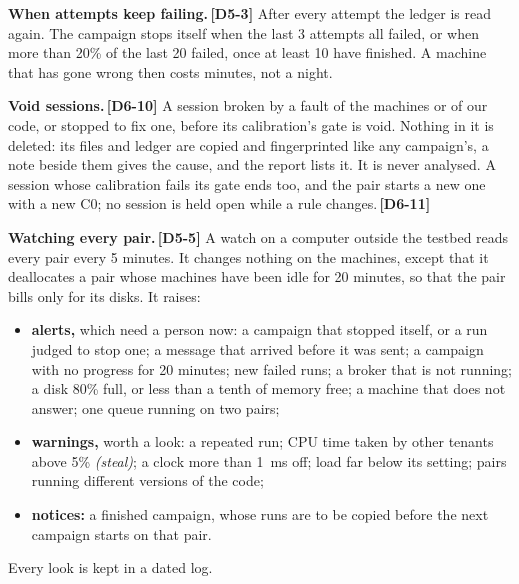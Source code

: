 \documentclass[11pt]{article}
\newcommand{\gl}[1]{{\color{soft}\itshape\small (#1)}}
\newcommand{\chgold}[1]{\,{\color{oldcol}\bfseries\footnotesize[#1]}}
\begin{document}
\textbf{When attempts keep failing.}\chgold{D5-3} After every attempt the ledger is read again. The campaign stops itself when the last 3 attempts all failed, or when more than 20\% of the last 20 failed, once at least 10 have finished. A machine that has gone wrong then costs minutes, not a night.

\textbf{Void sessions.}\chgold{D6-10} A session broken by a fault of the machines or of our code, or stopped to fix one, before its calibration's gate is void. Nothing in it is deleted: its files and ledger are copied and fingerprinted like any campaign's, a note beside them gives the cause, and the report lists it. It is never analysed. A session whose calibration fails its gate ends too, and the pair starts a new one with a new C0; no session is held open while a rule changes.\chgold{D6-11}

\textbf{Watching every pair.}\chgold{D5-5} A watch on a computer outside the testbed reads every pair every 5 minutes. It changes nothing on the machines, except that it deallocates a pair whose machines have been idle for 20 minutes, so that the pair bills only for its disks. It raises:
\begin{itemize}
  \item \textbf{alerts,} which need a person now: a campaign that stopped itself, or a run judged to stop one; a message that arrived before it was sent; a campaign with no progress for 20 minutes; new failed runs; a broker that is not running; a disk 80\% full, or less than a tenth of memory free; a machine that does not answer; one queue running on two pairs;
  \item \textbf{warnings,} worth a look: a repeated run; CPU time taken by other tenants above 5\% \gl{steal}; a clock more than 1~ms off; load far below its setting; pairs running different versions of the code;
  \item \textbf{notices:} a finished campaign, whose runs are to be copied before the next campaign starts on that pair.
\end{itemize}
Every look is kept in a dated log.
\end{document}
